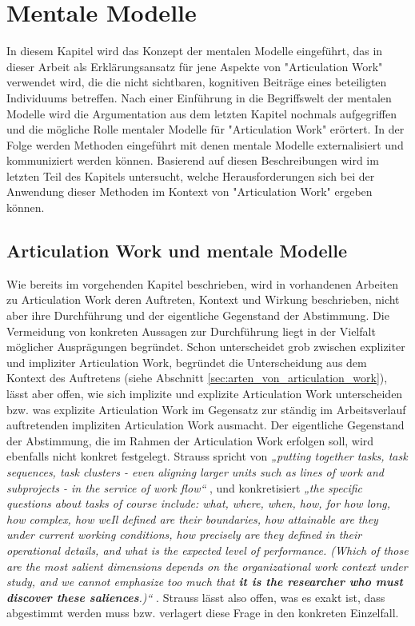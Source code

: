 \chapter{Mentale Modelle} %
\label{cha:mentale_modelle}

In diesem Kapitel wird das Konzept der mentalen Modelle eingeführt, das in dieser Arbeit als Erklärungsansatz für jene Aspekte von "Articulation Work" verwendet wird, die die nicht sichtbaren, kognitiven Beiträge eines beteiligten Individuums betreffen. Nach einer Einführung in die Begriffswelt der mentalen Modelle wird die Argumentation aus dem letzten Kapitel nochmals aufgegriffen und die mögliche Rolle mentaler Modelle für "Articulation Work" erörtert. In der Folge werden Methoden eingeführt mit denen mentale Modelle externalisiert und kommuniziert werden können. Basierend auf diesen Beschreibungen wird im letzten Teil des Kapitels untersucht, welche Herausforderungen sich bei der Anwendung dieser Methoden im Kontext von "Articulation Work" ergeben können.

\section{Articulation Work und mentale Modelle} %
\label{sec:articulation_work_und_mentale_modelle}

Wie bereits im vorgehenden Kapitel beschrieben, wird in vorhandenen Arbeiten zu Articulation Work deren Auftreten, Kontext und Wirkung beschrieben, nicht aber ihre Durchführung und der eigentliche Gegenstand der Abstimmung. Die Vermeidung von konkreten Aussagen zur Durchführung liegt in der Vielfalt möglicher Ausprägungen begründet. Schon \citet{Strauss88} unterscheidet grob zwischen expliziter und impliziter Articulation Work, begründet die Unterscheidung aus dem Kontext des Auftretens (siehe Abschnitt \ref{sec:arten_von_articulation_work}), lässt aber offen, wie sich implizite und explizite Articulation Work unterscheiden bzw. was explizite Articulation Work im Gegensatz zur ständig im Arbeitsverlauf auftretenden impliziten Articulation Work ausmacht. Der eigentliche Gegenstand der Abstimmung, die im Rahmen der Articulation Work erfolgen soll, wird ebenfalls nicht konkret festgelegt. Strauss spricht von \emph{„putting together tasks, task sequences, task clusters - even aligning larger units such as lines of work and subprojects - in the service of work flow“} \citep[][S. 2]{Strauss88}, und konkretisiert \emph{„the specific questions about tasks of course include: what, where, when, how, for how long, how complex, how weIl defined are their boundaries, how attainable are they under current working conditions, how precisely are they defined in their operational details, and what is the expected level of performance. (Which of those are the most salient dimensions depends on the organizational work context under study, and we cannot emphasize too much that \textbf{it is the researcher who must discover these saliences}.)“} \citep[][S. 6]{Strauss85}. Strauss lässt also offen, was es exakt ist, dass abgestimmt werden muss bzw. verlagert diese Frage in den konkreten Einzelfall. 

